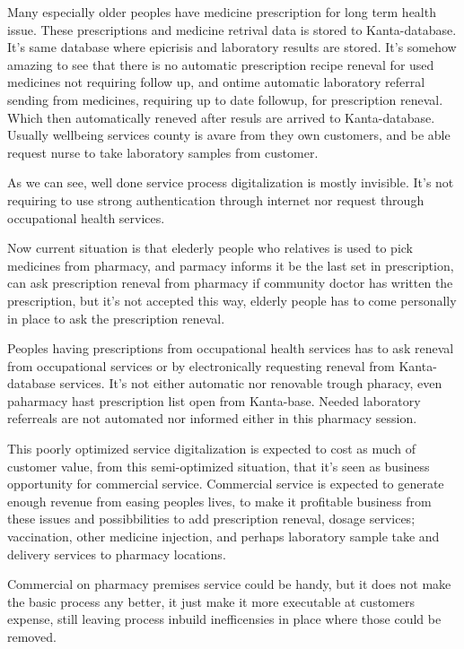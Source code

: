 Many especially older peoples have medicine\allowbreak\cite{Laakeinfo}
prescription for long term health issue\allowbreak\cite{Kaypahoito}.
These prescriptions and medicine retrival data is stored to
Kanta-database\allowbreak\cite{BASE}. It's same database where epicrisis
and laboratory\allowbreak\cite{Labs} results are stored. It's somehow
amazing to see that there is no automatic prescription recipe reneval for
used medicines not requiring follow up, and ontime automatic laboratory
referral sending from medicines, requiring up to date followup, for
prescription reneval. Which then automatically reneved after resuls are
arrived to Kanta-database. Usually wellbeing services county is avare
from they own customers, and be able request nurse to take laboratory
samples from customer.

As we can see, well done service process digitalization is mostly invisible.
It's not requiring to use strong authentication through internet nor request
through occupational health services.

Now current situation is that elederly people who relatives is used to pick
medicines from pharmacy, and parmacy informs it be the last set in
prescription, can ask prescription reneval from pharmacy if community doctor
has written the prescription, but it's not accepted this way, elderly people
has to come personally in place to ask the prescription reneval.

Peoples having prescriptions from occupational health services has to ask
reneval from occupational services or by electronically requesting reneval
from Kanta-database services. It's not either automatic nor renovable trough
pharacy, even paharmacy hast prescription list open from Kanta-base. Needed
laboratory referreals are not automated nor informed either in this pharmacy
session.

This poorly optimized service digitalization is expected to cost as much of
customer value, from this semi-optimized situation, that it's seen as
business opportunity for commercial service\allowbreak\cite{Yle202609211442}.
Commercial service is expected to generate enough revenue from easing peoples
lives, to make it profitable business from these issues and possibbilities to
add prescription reneval, dosage services; vaccination, other medicine
injection, and perhaps laboratory sample take and delivery services to
pharmacy locations.

Commercial on pharmacy premises service could be handy, but it does not make
the basic process any better, it just make it more executable at customers
expense, still leaving process inbuild inefficensies in place where those
could be removed.


